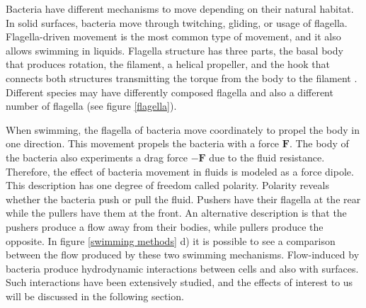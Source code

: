 Bacteria have different mechanisms to move depending on their natural habitat. In solid surfaces, bacteria move through twitching, gliding, or usage of flagella. Flagella-driven movement is the most common type of movement, and it also allows swimming in liquids. Flagella structure has three parts, the basal body that produces rotation, the filament, a helical propeller, and the hook that connects both structures transmitting the torque from the body to the filament \cite{Nakamura2019Flagella-drivenBacteria}. Different species may have differently composed flagella and also a different number of flagella (see figure \ref{flagella}). 





When swimming, the flagella of bacteria move coordinately to propel the body in one direction. This movement propels the bacteria with a force $\textbf{F}$. The body of the bacteria also experiments a drag force $-\textbf{F}$ due to the fluid resistance. Therefore, the effect of bacteria movement in fluids is modeled as a force dipole. This description has one degree of freedom called polarity. Polarity reveals whether the bacteria push or pull the fluid. Pushers have their flagella at the rear while the pullers have them at the front. An alternative description is that the pushers produce a flow away from their bodies, while pullers produce the opposite. In figure \ref{swimming methods} d) it is possible to see a comparison between the flow produced by these two swimming mechanisms. Flow-induced by bacteria produce hydrodynamic interactions between cells and also with surfaces. Such interactions have been extensively studied, and the effects of interest to us will be discussed in the following section. 


